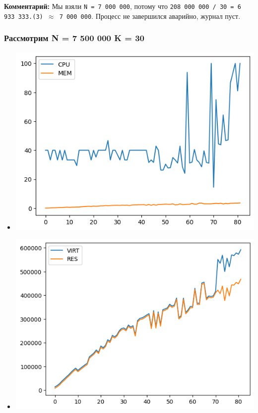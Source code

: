 \documentclass[10pt, a4paper]{article}
\begin{document}
\textbf{Комментарий: }
Мы взяли \texttt{N = 7 000 000}, потому что \texttt{208 000 000 / 30 = 6 933 333.(3) $\approx$  7 000 000}. 
Процесс не завершился аварийно, журнал пуст.

\subsubsection*{Рассмотрим \textbf{N = 7 500 000} \textbf{K = 30}}

\begin{itemize}
    \item \includegraphics[scale=0.8]{graphs/23.png}
    \item \includegraphics[scale=0.8]{graphs/24.png}

\end{itemize}
\end{document}
